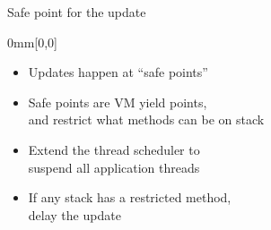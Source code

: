 \begin{frame}[t,label=suspend]{Safe point for the update}
\begin{textblock*}{0mm}[0,0]
%
\end{textblock*}%
\begin{itemize}%
\item Updates happen at ``safe points''
\item Safe points are VM yield points, \\
      and restrict what methods can be on stack
\item<3> Extend the thread scheduler to \\
      suspend all application threads
\item<3> If any stack has a restricted method, \\
      delay the update
\end{itemize}%
\end{frame}

